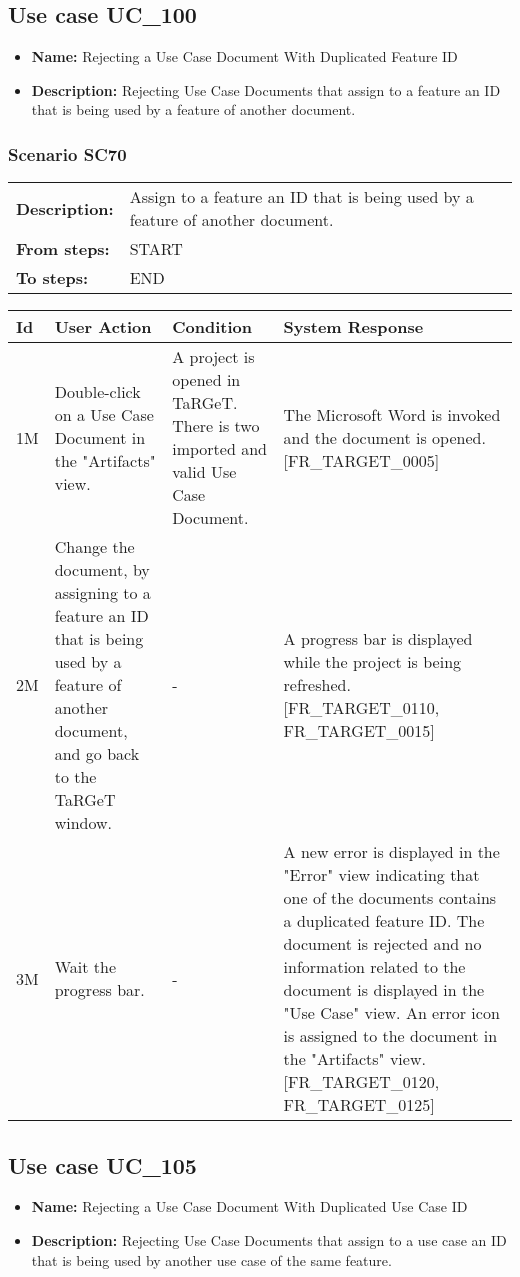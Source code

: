 \documentclass[a4paper,11pt]{article}
\newcommand{\bl}{\\ \hline}
\begin{document}
\subsection*{Use case UC_100}
\begin{itemize}
\item {\bf Name: }Rejecting a Use Case Document With Duplicated Feature ID
\item {\bf Description: }Rejecting Use Case Documents that assign to a feature an
				ID that is being used by a feature of another document.
			
\end{itemize}
\subsubsection*{Scenario SC70}
\begin{tabular}{p{1in}p{4in}}
{\bf Description:} & Assign to a feature an ID that is being used by a
					feature of another document. \\
{\bf From steps:} & START \\
{\bf To steps:} & END \\
\end{tabular}
 
\begin{tabular}{|p{0.8in}|p{1.6in}|p{1.6in}|p{1.6in}|}
\hline
Id & User Action & Condition & System Response  \bl 
1M & Double-click on a Use Case Document in the "Artifacts"
						view. & A project is opened in TaRGeT. There is two imported and
						valid Use Case Document. & The Microsoft Word is invoked and the document is opened.
						[FR_TARGET_0005] \bl 
2M & Change the document, by assigning to a feature an ID that
						is being used by a feature of another document, and go back to the
						TaRGeT window.  & - & A progress bar is displayed while the project is being
						refreshed. [FR_TARGET_0110, FR_TARGET_0015] \bl 
3M & Wait the progress bar. & - & A new error is displayed in the "Error" view indicating
						that one of the documents contains a duplicated feature ID. The
						document is rejected and no information related to the document is
						displayed in the "Use Case" view. An error icon is assigned to the
						document in the "Artifacts" view. [FR_TARGET_0120, FR_TARGET_0125]
					 \bl 
\end{tabular}
\subsection*{Use case UC_105}
\begin{itemize}
\item {\bf Name: }Rejecting a Use Case Document With Duplicated Use Case ID
			
\item {\bf Description: }Rejecting Use Case Documents that assign to a use case
				an ID that is being used by another use case of the same feature.
			
\end{itemize}
\end{document}
